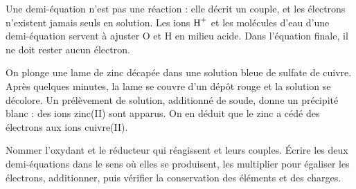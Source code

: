 \begin{attention}
Une demi-équation n'est pas une réaction : elle décrit un couple, et les électrons n'existent jamais seuls en solution. Les
ions $\ce{H+}$ et les molécules d'eau d'une demi-équation servent à ajuster O et H en milieu acide. Dans l'équation finale, il ne
doit rester aucun électron.
\end{attention}
\begin{experience}
On plonge une lame de zinc décapée dans une solution bleue de sulfate de cuivre. Après quelques minutes, la lame se
couvre d'un dépôt rouge et la solution se décolore. Un prélèvement de solution, additionné de soude, donne un précipité
blanc : des ions zinc(II) sont apparus. On en déduit que le zinc a cédé des électrons aux ions cuivre(II).
\end{experience}
\begin{rediger}
Nommer l'oxydant et le réducteur qui réagissent et leurs couples. Écrire les deux demi-équations dans le sens où elles se
produisent, les multiplier pour égaliser les électrons, additionner, puis vérifier la conservation des éléments et des
charges.
\end{rediger}
\exercices

